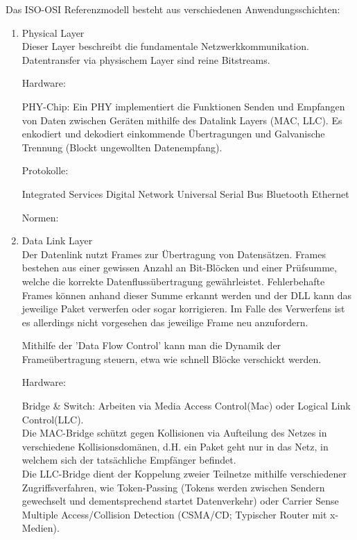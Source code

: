 \documentclass[11pt]{article}
\begin{document}
    Das ISO-OSI Referenzmodell besteht aus verschiedenen Anwendungsschichten:
    \begin{enumerate}
        \item Physical Layer\\
        Dieser Layer beschreibt die fundamentale Netzwerkkommunikation. Datentransfer via
        physischem Layer sind reine Bitstreams.

        Hardware:
        \begin{addmargin}[1em]{1em}
            PHY-Chip: Ein PHY implementiert die Funktionen Senden und Empfangen von Daten zwischen
            Geräten mithilfe des Datalink Layers (MAC, LLC). Es enkodiert und dekodiert einkommende
            Übertragungen und Galvanische Trennung (Blockt ungewollten Datenempfang).
        \end{addmargin}

        Protokolle:
        \begin{addmargin}[1em]{1em}
            Integrated Services Digital Network
            Universal Serial Bus
            Bluetooth
            Ethernet
        \end{addmargin}

        Normen:

        \item Data Link Layer\\
        Der Datenlink nutzt Frames zur Übertragung von Datensätzen. Frames bestehen aus einer gewissen Anzahl
        an Bit-Blöcken und einer Prüfsumme, welche die korrekte Datenflussübertragung gewährleistet.
        Fehlerbehafte Frames können anhand dieser Summe erkannt werden und der DLL kann das jeweilige Paket verwerfen
        oder sogar korrigieren.
        Im Falle des Verwerfens ist es allerdings nicht vorgesehen das jeweilige Frame neu anzufordern.

        Mithilfe der 'Data Flow Control' kann man die Dynamik der Frameübertragung steuern, etwa wie schnell
        Blöcke verschickt werden.

        Hardware:
        \begin{addmargin}[1em]{1em} %
            Bridge \& Switch: Arbeiten via Media Access Control(Mac) oder Logical Link Control(LLC).\\
            Die MAC-Bridge schützt gegen Kollisionen via Aufteilung des Netzes in verschiedene Kollisionsdomänen, d.H.
            ein Paket geht nur in das Netz, in welchem sich der tatsächliche Empfänger befindet.\\
            Die LLC-Bridge dient der Koppelung zweier Teilnetze mithilfe verschiedener Zugriffsverfahren, wie
            Token-Passing (Tokens werden zwischen Sendern gewechselt und dementsprechend startet Datenverkehr) oder
            Carrier Sense Multiple Access/Collision Detection (CSMA/CD; Typischer Router mit x-Medien).\\
        \end{addmargin}


\end{enumerate}
\end{document}
